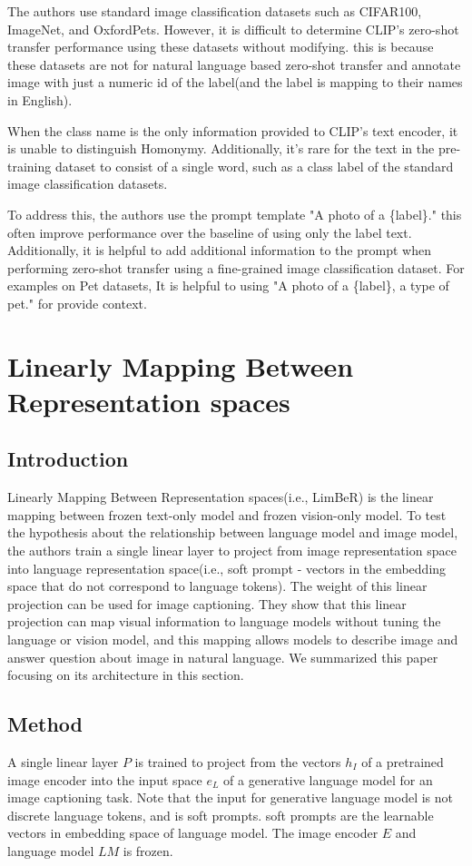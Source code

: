 \documentclass[extendedabs]{bmvc2k}
\begin{document}
The authors use standard image classification datasets such as CIFAR100, ImageNet, and OxfordPets. However, it is difficult to determine CLIP's zero-shot transfer performance using these datasets without modifying. this is because these datasets are not for natural language based zero-shot transfer and annotate image with just a numeric id of the label(and the label is mapping to their names in English).

When the class name is the only information provided to CLIP's text encoder, it is unable to distinguish Homonymy. Additionally, it's rare for the text in the pre-training dataset to consist of a single word, such as a class label of the standard image classification datasets.

To address this, the authors use the prompt template "A photo of a \{label\}." this often improve performance over the baseline of using only the label text. Additionally, it is helpful to add additional information to the prompt when performing zero-shot transfer using a fine-grained image classification dataset. For examples on Pet datasets, It is helpful to using "A photo of a \{label\}, a type of pet." for provide context.

\section{Linearly Mapping Between Representation spaces}
\subsection{Introduction}
Linearly Mapping Between Representation spaces(i.e., LimBeR)\cite{linearmapping} is the linear mapping between frozen text-only model and frozen vision-only model. To test the hypothesis about the relationship between language model and image model, the authors train a single linear layer to project from image representation space into language representation space(i.e., soft prompt - vectors in the embedding space that do not correspond to language tokens). The weight of this linear projection can be used for image captioning. They show that this linear projection can map visual information to language models without tuning the language or vision model, and this mapping allows models to describe image and answer question about image in natural language.
We summarized this paper\cite{linearmapping} focusing on its architecture in this section.

\subsection{Method}
A single linear layer $P$ is trained to project from the vectors $h_I$ of a pretrained image encoder into the input space $e_L$ of a generative language model for an image captioning task. Note that the input for generative language model is not discrete language tokens, and is soft prompts. soft prompts are the learnable vectors in embedding space of language model. The image encoder $E$ and language model $LM$ is frozen.
\end{document}

